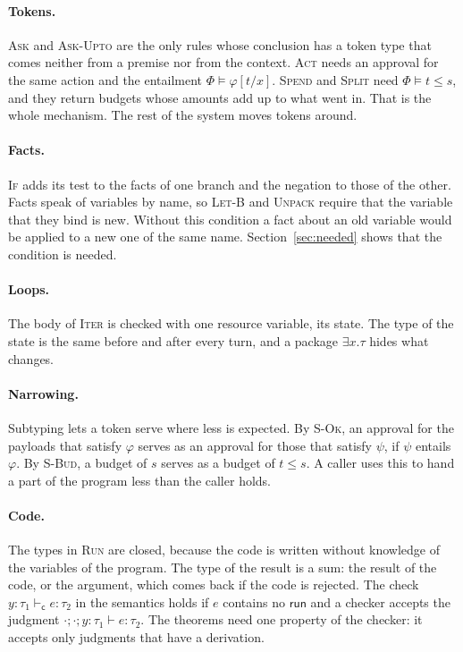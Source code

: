 \documentclass[acmsmall,nonacm,screen]{acmart}
\newcommand{\kw}[1]{\mathsf{#1}}
\newcommand{\code}{\kw{c}}
\begin{document}
\paragraph{Tokens.} \textsc{Ask} and \textsc{Ask-Upto} are the only rules whose conclusion has
a token type that comes neither from a premise nor from the context. \textsc{Act} needs an approval for the same
action and the entailment $\Phi \models \varphi[t/x]$. \textsc{Spend} and \textsc{Split} need
$\Phi \models t \le s$, and they return budgets whose amounts add up to what went in. That is
the whole mechanism. The rest of the system moves tokens around.

\paragraph{Facts.} \textsc{If} adds its test to the facts of one branch and the negation to
those of the other. Facts speak of variables by name, so \textsc{Let-B} and \textsc{Unpack}
require that the variable that they bind is new. Without this condition a fact about an old
variable would be applied to a new one of the same name. Section~\ref{sec:needed} shows that
the condition is needed.

\paragraph{Loops.} The body of \textsc{Iter} is checked with one resource variable, its state.
The type of the state is the same before and after every turn, and a package $\exists x.\tau$
hides what changes.

\paragraph{Narrowing.} Subtyping lets a token serve where less is expected. By \textsc{S-Ok},
an approval for the payloads that satisfy $\varphi$ serves as an approval for those that
satisfy $\psi$, if $\psi$ entails $\varphi$. By \textsc{S-Bud}, a budget of $s$ serves as a
budget of $t \le s$. A caller uses this to hand a part of the program less than the caller
holds.

\paragraph{Code.} The types in \textsc{Run} are closed, because the code is written without
knowledge of the variables of the program. The type of the result is a sum: the result of the
code, or the argument, which comes back if the code is rejected. The check
$y{:}\tau_1 \vdash_{\code} e : \tau_2$ in the semantics holds if $e$ contains no $\kw{run}$
and a checker accepts the judgment $\cdot; \cdot; y{:}\tau_1 \vdash e : \tau_2$. The theorems
need one property of the checker: it accepts only judgments that have a derivation.
\end{document}

